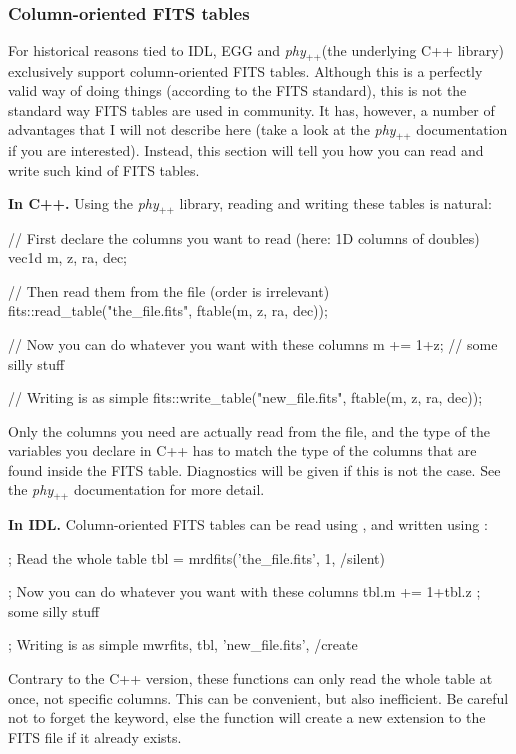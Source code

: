 \documentclass[12pt,a4paper]{article}
\newcommand{\phypp}{\textit{phy}$_{\text{++}}$\xspace}
\newcommand{\egg}{\textsc{EGG}\xspace}
\begin{document}
\subsubsection{Column-oriented FITS tables}

For historical reasons tied to IDL, \egg and \phypp (the underlying C++ library) exclusively support column-oriented FITS tables. Although this is a perfectly valid way of doing things (according to the FITS standard), this is not the standard way FITS tables are used in community. It has, however, a number of advantages that I will not describe here (take a look at the \phypp documentation if you are interested). Instead, this section will tell you how you can read and write such kind of FITS tables.

{\bf In C++.} Using the \phypp library, reading and writing these tables is natural:
\begin{cppcode}
// First declare the columns you want to read (here: 1D columns of doubles)
vec1d m, z, ra, dec;

// Then read them from the file (order is irrelevant)
fits::read_table("the_file.fits", ftable(m, z, ra, dec));

// Now you can do whatever you want with these columns
m += 1+z; // some silly stuff

// Writing is as simple
fits::write_table("new_file.fits", ftable(m, z, ra, dec));
\end{cppcode}
Only the columns you need are actually read from the file, and the type of the variables you declare in C++ has to match the type of the columns that are found inside the FITS table. Diagnostics will be given if this is not the case. See the \phypp documentation for more detail.

{\bf In IDL.} Column-oriented FITS tables can be read using , and written using :
\begin{idlcode}
; Read the whole table
tbl = mrdfits('the_file.fits', 1, /silent)

; Now you can do whatever you want with these columns
tbl.m += 1+tbl.z ; some silly stuff

; Writing is as simple
mwrfits, tbl, 'new_file.fits', /create
\end{idlcode}
Contrary to the C++ version, these functions can only read the whole table at once, not specific columns. This can be convenient, but also inefficient. Be careful not to forget the  keyword, else the function will create a new extension to the FITS file if it already exists.
\end{document}
